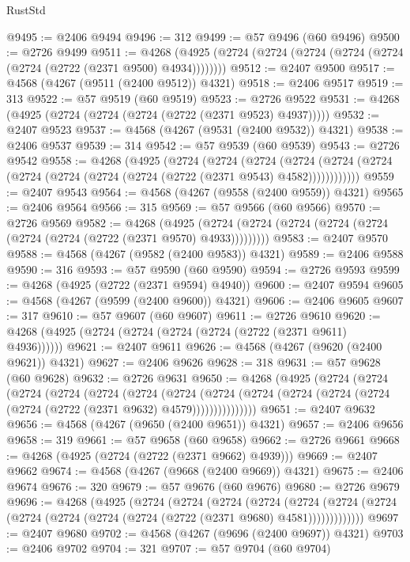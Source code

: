 \begin{lexlean}{RustStd}
\begin{coremodule}
@9495 := @2406 @9494
@9496 := 312
@9499 := @57 @9496 (@60 @9496)
@9500 := @2726 @9499
@9511 := @4268 (@4925 (@2724 (@2724 (@2724 (@2724 (@2724 (@2724 (@2722 (@2371 @9500) @4934))))))))
@9512 := @2407 @9500
@9517 := @4568 (@4267 (@9511 (@2400 @9512)) @4321)
@9518 := @2406 @9517
@9519 := 313
@9522 := @57 @9519 (@60 @9519)
@9523 := @2726 @9522
@9531 := @4268 (@4925 (@2724 (@2724 (@2724 (@2722 (@2371 @9523) @4937)))))
@9532 := @2407 @9523
@9537 := @4568 (@4267 (@9531 (@2400 @9532)) @4321)
@9538 := @2406 @9537
@9539 := 314
@9542 := @57 @9539 (@60 @9539)
@9543 := @2726 @9542
@9558 := @4268
    (@4925
      (@2724
        (@2724
          (@2724
            (@2724 (@2724 (@2724 (@2724 (@2724 (@2724 (@2724 (@2722 (@2371 @9543) @4582))))))))))))
@9559 := @2407 @9543
@9564 := @4568 (@4267 (@9558 (@2400 @9559)) @4321)
@9565 := @2406 @9564
@9566 := 315
@9569 := @57 @9566 (@60 @9566)
@9570 := @2726 @9569
@9582 := @4268
    (@4925 (@2724 (@2724 (@2724 (@2724 (@2724 (@2724 (@2724 (@2722 (@2371 @9570) @4933)))))))))
@9583 := @2407 @9570
@9588 := @4568 (@4267 (@9582 (@2400 @9583)) @4321)
@9589 := @2406 @9588
@9590 := 316
@9593 := @57 @9590 (@60 @9590)
@9594 := @2726 @9593
@9599 := @4268 (@4925 (@2722 (@2371 @9594) @4940))
@9600 := @2407 @9594
@9605 := @4568 (@4267 (@9599 (@2400 @9600)) @4321)
@9606 := @2406 @9605
@9607 := 317
@9610 := @57 @9607 (@60 @9607)
@9611 := @2726 @9610
@9620 := @4268 (@4925 (@2724 (@2724 (@2724 (@2724 (@2722 (@2371 @9611) @4936))))))
@9621 := @2407 @9611
@9626 := @4568 (@4267 (@9620 (@2400 @9621)) @4321)
@9627 := @2406 @9626
@9628 := 318
@9631 := @57 @9628 (@60 @9628)
@9632 := @2726 @9631
@9650 := @4268
    (@4925
      (@2724
        (@2724
          (@2724
            (@2724
              (@2724
                (@2724
                  (@2724
                    (@2724
                      (@2724 (@2724 (@2724 (@2724 (@2724 (@2722 (@2371 @9632) @4579)))))))))))))))
@9651 := @2407 @9632
@9656 := @4568 (@4267 (@9650 (@2400 @9651)) @4321)
@9657 := @2406 @9656
@9658 := 319
@9661 := @57 @9658 (@60 @9658)
@9662 := @2726 @9661
@9668 := @4268 (@4925 (@2724 (@2722 (@2371 @9662) @4939)))
@9669 := @2407 @9662
@9674 := @4568 (@4267 (@9668 (@2400 @9669)) @4321)
@9675 := @2406 @9674
@9676 := 320
@9679 := @57 @9676 (@60 @9676)
@9680 := @2726 @9679
@9696 := @4268
    (@4925
      (@2724
        (@2724
          (@2724
            (@2724
              (@2724
                (@2724 (@2724 (@2724 (@2724 (@2724 (@2724 (@2722 (@2371 @9680) @4581)))))))))))))
@9697 := @2407 @9680
@9702 := @4568 (@4267 (@9696 (@2400 @9697)) @4321)
@9703 := @2406 @9702
@9704 := 321
@9707 := @57 @9704 (@60 @9704)

\end{coremodule}
\end{lexlean}
